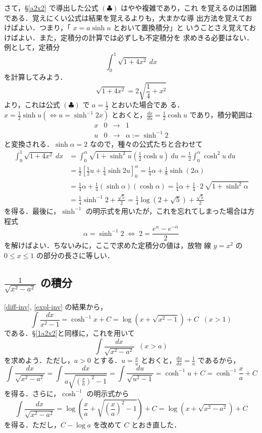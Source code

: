 \documentclass[dvipdfmx,12pt, uplatex]{jsarticle}
\newcommand{\ds}{\displaystyle}
\begin{document}
さて，\S\ref{a2x2} で導出した公式 $(\clubsuit)$ はやや複雑であり，これ
を覚えるのは困難である．覚えにくい公式は結果を覚えるよりも，大まかな導
出方法を覚えておけばよい．つまり，「 $x=a \sinh u$ とおいて置換積分」と
いうことさえ覚えておけばよい．また，定積分の計算では必ずしも不定積分を
求めきる必要はない．例として，定積分
\[
  \int_{0}^{1} \sqrt{1+4x^2} \ dx
\]
を計算してみよう．
\[
\sqrt{1+4x^2} = 2\sqrt{\frac{1}{4} + x^2}
\]
より，これは公式 $(\clubsuit)$ で $a=\frac{1}{2}$ とおいた場合であ
る．$x=\frac{1}{2}\sinh u \left( \Leftrightarrow u =
  \sinh^{-1}2x\right) $ とおくと，$\frac{dx}{du} = \frac{1}{2} \cosh
u$ であり，積分範囲は
\[
\begin{array}{c|ccc}
  x & 0 & \to & 1\\ \hline
  u & 0 & \to & \alpha:=\sinh^{-1}2
\end{array}
\]
と変換される．$\sinh \alpha =2$ なので，種々の公式たちと合わせて
\[
  \begin{aligned}
    \int_{0}^{1} \sqrt{1+4x^2} \ dx &= \int_{0}^{\alpha} \sqrt{1+\sinh^2 u} 
    \left( \frac{1}{2} \cosh u \right) \ du = \frac{1}{2} \int_{0}^{\alpha} \cosh^2 u \ du\\
    &= \frac{1}{2} \left[ \frac{1}{2} u +\frac{1}{4} \sinh 2u \right]_{0}^{\alpha}
    =\frac{1}{4} \alpha + \frac{1}{8} \sinh \left(2\alpha\right) \\
    &= \frac{1}{4} \alpha + \frac{1}{4} \left(  \sinh \alpha \right)
    \left( \cosh \alpha \right) 
    = \frac{1}{4} \alpha + \frac{1}{4} \cdot 2 \ \sqrt{1+\sinh^2 \alpha}\\
    &= \frac{1}{4} \sinh^{-1}2 + \frac{\sqrt{5}}{2}
    = \frac{1}{4} \log\left(2+\sqrt{5}\right) + \frac{\sqrt{5}}{2}
\end{aligned}
\]
を得る．最後に，$\sinh^{-1}$ の明示式を用いたが，これを忘れてしまった場合は方程式
\[
  \alpha= \sinh^{-1}2 \; \Leftrightarrow \; 2 = \frac{e^{\alpha} - e^{-\alpha}}{2}
\]
を解けばよい．ちないみに，ここで求めた定積分の値は，放物
線 $y=x^2$ の $0 \leq x \leq 1$ の部分の長さに等しい．


\subsection{ $\ds \frac{1}{\sqrt{x^2-a^2}}$ の積分}

\ref{diff-inv}, \ref{expl-inv} の結果から，
\[
  \int \frac{dx}{x^2-1} = \cosh^{-1} x +C = \log \left( x+\sqrt{x^2-1} \right) +C \;\; (x >1)
\]
である．\S\ref{1a2x2}と同様に，これを用いて
\[
  \int \frac{dx}{\sqrt{x^2-a^2}} \; \; (x>a)
\]
を求めよう．ただし，$a>0$ とする．$u=\frac{x}{u}$ とおくと，$\frac{du}{dx}=\frac{1}{a}$ であるから，
\[
  \int \frac{dx}{\sqrt{x^2-a^2}} = \int \frac{dx}{a\sqrt{\left( \frac{x}{a}\right)^2-1}}
  = \int \frac{du}{\sqrt{u^2-1}} = \cosh^{-1} u +C = \cosh^{-1} \frac{x}{a} +C
\]
を得る．さらに，$\cosh^{-1}$ の明示式から
\[
  \int \frac{dx}{\sqrt{x^2-a^2}} = \log \left( \frac{x}{a} + \sqrt{\left( \frac{x}{a}\right)^2-1} \right)  +C
    = \log \left( x+ \sqrt{x^2-a^2} \right) +C
\]
を得る．ただし，$C-\log a$ を改めて $C$ とおき直した．
\end{document}
